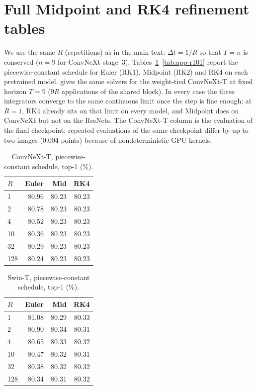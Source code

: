 \section{Full Midpoint and RK4 refinement tables}
\label{app:solvers}

We use the same $R$ (repetitions) as in the main text: $\Delta t{=}1/R$ so that
$T{=}n$ is conserved ($n{=}9$ for ConvNeXt stage~3).
Tables~\ref{tab:app-cnx}--\ref{tab:app-r101} report the piecewise-constant schedule for Euler (RK1),
Midpoint (RK2) and RK4 on each pretrained model.
 gives the same solvers for the weight-tied ConvNeXt-T at
fixed horizon $T{=}9$ ($9R$ applications of the shared block).
In every case the three integrators converge to the same continuous limit once the
step is fine enough; at $R{=}1$, RK4 already sits on that limit on every model, and
Midpoint does on ConvNeXt but not on the ResNets.
The ConvNeXt-T column is the evaluation of the final checkpoint; repeated evaluations
of the same checkpoint differ by up to two images ($0.004$ points) because of
nondeterministic GPU kernels.

\begin{table}[t]
    \centering
    \caption{ConvNeXt-T, piecewise-constant schedule, top-1 (\%).}
    \label{tab:app-cnx}
    \setlength{\tabcolsep}{4pt}
    \begin{tabular}{lrrr}
        \toprule
        $R$ & Euler & Mid & RK4 \\
        \midrule
        1   & 80.96 & 80.23 & 80.23 \\
        2   & 80.78 & 80.23 & 80.23 \\
        4   & 80.52 & 80.23 & 80.23 \\
        10  & 80.36 & 80.23 & 80.23 \\
        32  & 80.29 & 80.23 & 80.23 \\
        128 & 80.24 & 80.23 & 80.23 \\
        \bottomrule
    \end{tabular}
\end{table}

\begin{table}[t]
    \centering
    \caption{Swin-T, piecewise-constant schedule, top-1 (\%).}
    \label{tab:app-swin}
    \setlength{\tabcolsep}{4pt}
    \begin{tabular}{lrrr}
        \toprule
        $R$ & Euler & Mid & RK4 \\
        \midrule
        1   & 81.08 & 80.29 & 80.33 \\
        2   & 80.90 & 80.34 & 80.31 \\
        4   & 80.65 & 80.33 & 80.32 \\
        10  & 80.47 & 80.32 & 80.31 \\
        32  & 80.38 & 80.32 & 80.32 \\
        128 & 80.34 & 80.31 & 80.32 \\
        \bottomrule
    \end{tabular}
\end{table}

